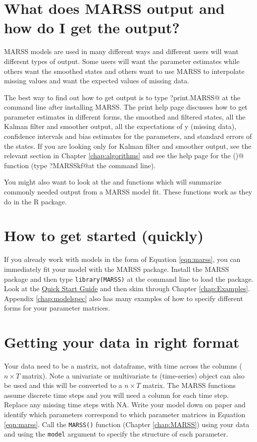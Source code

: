 \section{What does MARSS output and how do I get the output?}
MARSS models are used in many different ways and different users will want different types of output.  Some users will want the parameter estimates while others want the smoothed states and others want to use MARSS to interpolate missing values and want the expected values of missing data.  

The best way to find out how to get output is to type \verb@?print.MARSS@ at the command line after installing MARSS.  The print help page discusses how to get parameter estimates in different forms, the smoothed and filtered states, all the Kalman filter and smoother output, all the expectations of y (missing data), confidence intervals and bias estimates for the parameters, 
and standard errors of the states.  If you are looking only for Kalman filter and smoother output, see the relevant section in Chapter \ref{chap:algorithms} and see the help page for the \verb@MARSSkf()@ function (type \verb@?MARSSkf@at the \R command line).

You might also want to look at the \verb@tidy@ and \verb@glance@ functions which will summarize commonly needed output from a MARSS model fit.  These functions work as they do in the \verb@broom@ R package.

\section{How to get started (quickly)}

If you already work with models in the form of Equation \ref{eqn:marss}, you can immediately fit your model with the MARSS package.  Install the MARSS package and then type \texttt{library(MARSS)} at the command line to load the package.  Look at the \href{https://cran.r-project.org/web/packages/MARSS/vignettes/Quick_Start.pdf}{Quick Start Guide} and then skim through Chapter \ref{chap:Examples}.  Appendix \ref{chap:modelspec} also has many examples of how to specify different forms for your parameter matrices. 

\section{Getting your data in right format}
Your data need to be a matrix, not dataframe, with time across the columns ($n \times T$ matrix). Note a univariate or multivariate ts (time-series) object can also be used and this will be converted to a $n \times T$ matrix. The MARSS functions assume discrete time steps and you will need a column for each time step.  Replace any missing time steps with NA.  Write your model down on paper and identify which parameters correspond to which parameter matrices in Equation \ref{eqn:marss}.  Call the \texttt{MARSS()} function (Chapter \ref{chap:MARSS}) using your data and using the \texttt{model} argument to specify the structure of each parameter. 

